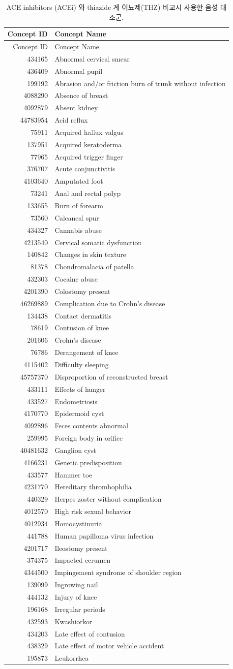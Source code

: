 \documentclass[10.5pt]{book}
\theoremstyle{definition}
\theoremstyle{definition}
\theoremstyle{definition}
\theoremstyle{remark}
\begin{document}
\begin{longtable}[]{@{}rl@{}}
\caption{\label{tab:AceiThzNsc} ACE inhibitors (ACEi) 와 thiazide 계
이뇨제(THZ) 비교시 사용한 음성 대조군.}\tabularnewline
\toprule
Concept ID & Concept Name\tabularnewline
\midrule
\endfirsthead
\toprule
Concept ID & Concept Name\tabularnewline
\midrule
\endhead
434165 & Abnormal cervical smear\tabularnewline
436409 & Abnormal pupil\tabularnewline
199192 & Abrasion and/or friction burn of trunk without
infection\tabularnewline
4088290 & Absence of breast\tabularnewline
4092879 & Absent kidney\tabularnewline
44783954 & Acid reflux\tabularnewline
75911 & Acquired hallux valgus\tabularnewline
137951 & Acquired keratoderma\tabularnewline
77965 & Acquired trigger finger\tabularnewline
376707 & Acute conjunctivitis\tabularnewline
4103640 & Amputated foot\tabularnewline
73241 & Anal and rectal polyp\tabularnewline
133655 & Burn of forearm\tabularnewline
73560 & Calcaneal spur\tabularnewline
434327 & Cannabis abuse\tabularnewline
4213540 & Cervical somatic dysfunction\tabularnewline
140842 & Changes in skin texture\tabularnewline
81378 & Chondromalacia of patella\tabularnewline
432303 & Cocaine abuse\tabularnewline
4201390 & Colostomy present\tabularnewline
46269889 & Complication due to Crohn's disease\tabularnewline
134438 & Contact dermatitis\tabularnewline
78619 & Contusion of knee\tabularnewline
201606 & Crohn's disease\tabularnewline
76786 & Derangement of knee\tabularnewline
4115402 & Difficulty sleeping\tabularnewline
45757370 & Disproportion of reconstructed breast\tabularnewline
433111 & Effects of hunger\tabularnewline
433527 & Endometriosis\tabularnewline
4170770 & Epidermoid cyst\tabularnewline
4092896 & Feces contents abnormal\tabularnewline
259995 & Foreign body in orifice\tabularnewline
40481632 & Ganglion cyst\tabularnewline
4166231 & Genetic predisposition\tabularnewline
433577 & Hammer toe\tabularnewline
4231770 & Hereditary thrombophilia\tabularnewline
440329 & Herpes zoster without complication\tabularnewline
4012570 & High risk sexual behavior\tabularnewline
4012934 & Homocystinuria\tabularnewline
441788 & Human papilloma virus infection\tabularnewline
4201717 & Ileostomy present\tabularnewline
374375 & Impacted cerumen\tabularnewline
4344500 & Impingement syndrome of shoulder region\tabularnewline
139099 & Ingrowing nail\tabularnewline
444132 & Injury of knee\tabularnewline
196168 & Irregular periods\tabularnewline
432593 & Kwashiorkor\tabularnewline
434203 & Late effect of contusion\tabularnewline
438329 & Late effect of motor vehicle accident\tabularnewline
195873 & Leukorrhea\tabularnewline

\end{longtable}
\end{document}
